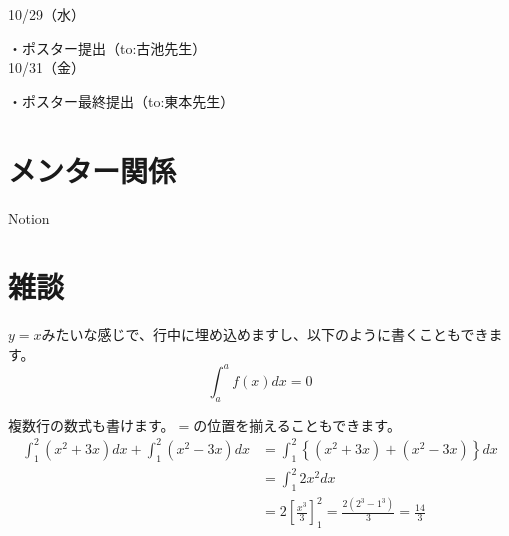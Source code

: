 \documentclass[a4paper,12pt]{ltjsarticle}
\begin{document}
10/29（水）

・ポスター提出（to:古池先生）\\

10/31（金）

・ポスター最終提出（to:東本先生）
\clearpage

\section{メンター関係}
Notion
\clearpage

\section{雑談}
$y = x$みたいな感じで、行中に埋め込めますし、以下のように書くこともできます。\\

\begin{equation}
  \int_{a}^{a}f\left(x\right)dx = 0
\end{equation}

複数行の数式も書けます。$=$の位置を揃えることもできます。\\

\begin{align}
  \int_{1}^{2}\left(x^2 + 3x\right)dx + \int_{1}^{2}\left(x^2 - 3x\right)dx &= \int_{1}^{2}\left\{\left(x^2 + 3x\right) + \left(x^2 - 3x\right)\right\}dx \\
  &= \int_{1}^{2}2x^2dx \\
  &= 2\left[\frac{x^3}{3}\right]^2_1 = \frac{2\left(2^3 - 1^3\right)}{3} = \frac{14}{3}
\end{align}
\end{document}
